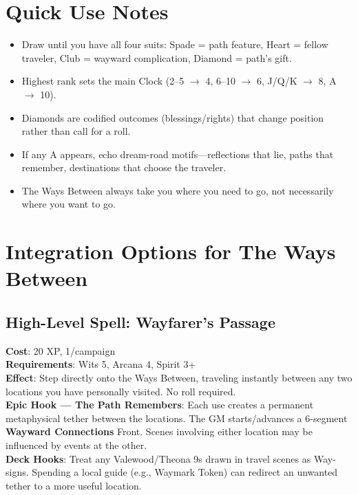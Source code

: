 \section*{Quick Use Notes}
\begin{itemize}
\item Draw until you have all four suits: Spade = path feature, Heart = fellow traveler, Club = wayward complication, Diamond = path's gift.
\item Highest rank sets the main Clock (2--5 $\rightarrow$ 4, 6--10 $\rightarrow$ 6, J/Q/K $\rightarrow$ 8, A $\rightarrow$ 10).
\item Diamonds are codified outcomes (blessings/rights) that change position rather than call for a roll.
\item If any A appears, echo dream-road motifs---reflections that lie, paths that remember, destinations that choose the traveler.
\item The Ways Between always take you where you need to go, not necessarily where you want to go.
\end{itemize}

\section*{Integration Options for The Ways Between}

\subsection*{High-Level Spell: Wayfarer's Passage}
\textbf{Cost}: 20 XP, 1/campaign \\
\textbf{Requirements}: Wits 5, Arcana 4, Spirit 3+ \\
\textbf{Effect}: Step directly onto the Ways Between, traveling instantly between any two locations you have personally visited. No roll required. \\
\textbf{Epic Hook --- The Path Remembers}: Each use creates a permanent metaphysical tether between the locations. The GM starts/advances a 6-segment \textbf{Wayward Connections} Front. Scenes involving either location may be influenced by events at the other. \\
\textbf{Deck Hooks}: Treat any Valewood/Theona 9s drawn in travel scenes as Way-signs. Spending a local guide (e.g., Waymark Token) can redirect an unwanted tether to a more useful location.

